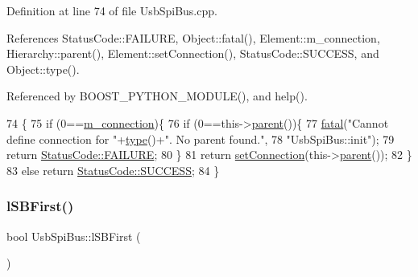 Definition at line 74 of file Usb\+Spi\+Bus.\+cpp.



References Status\+Code\+::\+F\+A\+I\+L\+U\+RE, Object\+::fatal(), Element\+::m\+\_\+connection, Hierarchy\+::parent(), Element\+::set\+Connection(), Status\+Code\+::\+S\+U\+C\+C\+E\+SS, and Object\+::type().



Referenced by B\+O\+O\+S\+T\+\_\+\+P\+Y\+T\+H\+O\+N\+\_\+\+M\+O\+D\+U\+L\+E(), and help().


\begin{DoxyCode}
74                            \{
75   \textcolor{keywordflow}{if} (0==\hyperlink{classElement_abe3de7a5dbbc9a6dd2d7e012e5fdb266}{m\_connection})\{
76     \textcolor{keywordflow}{if} (0==this->\hyperlink{classHierarchy_a1c7bec8257e717f9c1465e06ebf845fc}{parent}())\{
77       \hyperlink{classObject_aad5a16aac7516ce65bd5ec02ab07fc80}{fatal}(\textcolor{stringliteral}{"Cannot define connection for "}+\hyperlink{classObject_a84f99f70f144a83e1582d1d0f84e4e62}{type}()+\textcolor{stringliteral}{". No parent found."},
78           \textcolor{stringliteral}{"UsbSpiBus::init"});
79         \textcolor{keywordflow}{return} \hyperlink{classStatusCode_a6f565cbeadc76d14c72f047e5e85eb4ba3da73d4c469762eb9d3c960368252b26}{StatusCode::FAILURE};
80     \}
81     \textcolor{keywordflow}{return} \hyperlink{classElement_ab476b4b1df5954141ceb14f072433b89}{setConnection}(this->\hyperlink{classHierarchy_a1c7bec8257e717f9c1465e06ebf845fc}{parent}());
82   \}
83   \textcolor{keywordflow}{else} \textcolor{keywordflow}{return} \hyperlink{classStatusCode_a6f565cbeadc76d14c72f047e5e85eb4badd0da38d3ba0d922efd1f4619bc37ad8}{StatusCode::SUCCESS};
84 \}
\end{DoxyCode}
\mbox{\label{classUsbSpiBus_af6af49c1ac52cc0586570c1f43d0bc25}} 
\subsubsection{\texorpdfstring{l\+S\+B\+First()}{lSBFirst()}}
{\footnotesize\ttfamily bool Usb\+Spi\+Bus\+::l\+S\+B\+First (\begin{DoxyParamCaption}{ }\end{DoxyParamCaption})\hspace{0.3cm}{\ttfamily [inline]}}




